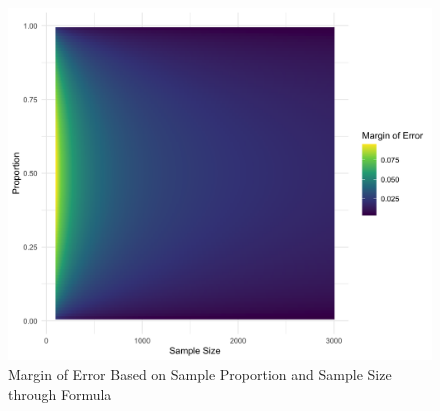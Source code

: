 \documentclass{article}\usepackage[]{graphicx}\usepackage[]{xcolor}
\begin{document}
\begin{multicols}{2}
\begin{figure}[H]
\begin{center}
\includegraphics[scale=0.14]{fifth.png}
\caption{Margin of Error Based on Sample Proportion and Sample Size through Formula}
\label{Figure 5}
\end{center}
\end{figure}





\vspace{2em}


\begin{tiny}

\end{tiny}
\end{multicols}
\end{document}

